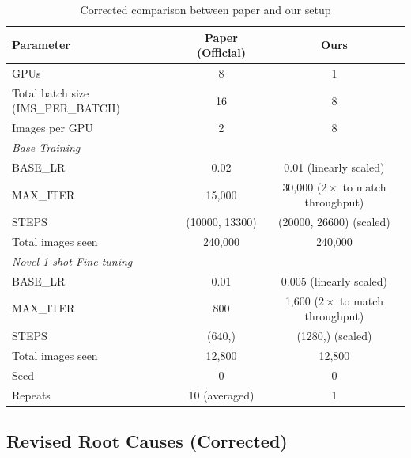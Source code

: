 \documentclass[11pt,a4paper]{article}
\begin{document}
\begin{table}[h]
\centering
\caption{Corrected comparison between paper and our setup}
\small
\begin{tabular}{lcc}
\toprule
\textbf{Parameter} & \textbf{Paper (Official)} & \textbf{Ours} \\
\midrule
GPUs & 8 & 1 \\
Total batch size (IMS\_PER\_BATCH) & 16 & 8 \\
Images per GPU & 2 & 8 \\
\midrule
\multicolumn{3}{l}{\textit{Base Training}} \\
BASE\_LR & 0.02 & 0.01 (linearly scaled) \\
MAX\_ITER & 15,000 & 30,000 ($2\times$ to match throughput) \\
STEPS & (10000, 13300) & (20000, 26600) (scaled) \\
Total images seen & 240,000 & 240,000 \\
\midrule
\multicolumn{3}{l}{\textit{Novel 1-shot Fine-tuning}} \\
BASE\_LR & 0.01 & 0.005 (linearly scaled) \\
MAX\_ITER & 800 & 1,600 ($2\times$ to match throughput) \\
STEPS & (640,) & (1280,) (scaled) \\
Total images seen & 12,800 & 12,800 \\
\midrule
Seed & 0 & 0 \\
Repeats & 10 (averaged) & 1 \\
\bottomrule
\end{tabular}
\end{table}

\subsection{Revised Root Causes (Corrected)}
\end{document}
